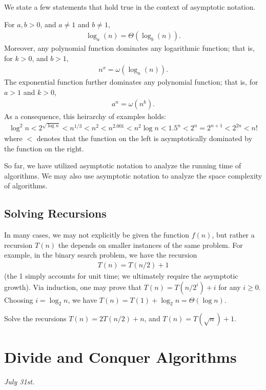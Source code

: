 We state a few statements that hold true in the context of asymptotic notation.

For $a,b > 0$, and $a \neq 1$ and $b \neq 1$,
\begin{align}
    \log_{a}(n) = \Theta(\log_{b}(n)).
\end{align}
Moreover, any polynomial function dominates any logarithmic function; that is, for $k > 0$, and $b > 1$,
\begin{align}
    n^{x} = \omega(\log_{n}(n)).
\end{align}
The exponential function further dominates any polynomial function; that is, for $a > 1$ and $k > 0$,
\begin{align}
    a^{n} = \omega(n^{k}).
\end{align}
As a consequence, this heirarchy of examples holds:
\begin{align}
    \log^{2} n < 2^{\sqrt{\log n}} < n^{1/3} < n^{2} < n^{2.001} < n^{2}\log n < 1.5^{n} < 2^{n} = 2^{n+1} < 2^{2n} < n!
\end{align}
where $<$ denotes that the function on the left is asymptotically dominated by the function on the right.

So far, we have utilized asymptotic notation to analyze the running time of algorithms. We may also use asymptotic notation to analyze the space complexity of algorithms.

\subsection{Solving Recursions}
In many cases, we may not explicitly be given the function $f(n)$, but rather a recursion $T(n)$ the depends on smaller instances of the same problem. For example, in the binary search problem, we have the recursion
\begin{align}
    T(n) = T(n/2) + 1
\end{align}
(the 1 simply accounts for unit time; we ultimately require the asymptotic growth). Via induction, one may prove that $T(n) = T(n/2^{i}) + i$ for any $i \geq 0$. Choosing $i = \log_{2} n$, we have $T(n) = T(1) + \log_{2} n = \Theta(\log n)$.
\begin{example}
    Solve the recursions $T(n) = 2T(n/2)+n$, and $T(n) = T(\sqrt{n})+1$.
\end{example}


\section{Divide and Conquer Algorithms}
\textit{July 31st.}

